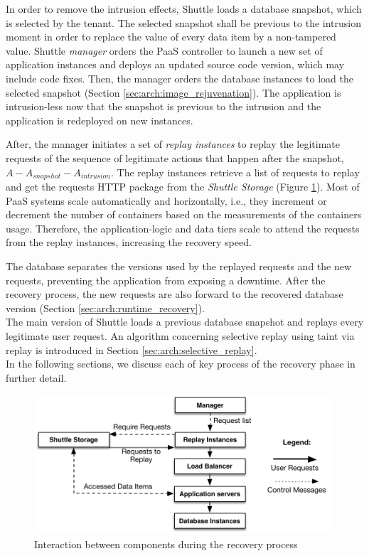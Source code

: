 In order to remove the intrusion effects, Shuttle loads a database snapshot, which is selected by the tenant. The selected snapshot shall be previous to the intrusion moment in order to replace the value of every data item by a non-tampered value. Shuttle \textit{manager} orders the \ac{PaaS} controller to launch a new set of application instances and deploys an updated source code version, which may include code fixes. Then, the manager orders the database instances to load the selected snapshot (Section \ref{sec:arch:image_rejuvenation}). The application is intrusion-less now that the snapshot is previous to the intrusion and the application is redeployed on new instances. 

After, the manager initiates a set of \textit{replay instances} to replay the legitimate requests of the sequence of legitimate actions that happen after the snapshot, $A-A_{snapshot}-A_{intrusion}$. The replay instances retrieve a list of requests to replay and get the requests \ac{HTTP} package from the \emph{Shuttle Storage} (Figure \ref{fig:replay_execution}). Most of \ac{PaaS} systems scale automatically and horizontally, i.e., they increment or decrement the number of containers based on the measurements of the containers usage. Therefore, the application-logic and data tiers scale to attend the requests from the replay instances, increasing the recovery speed.

The database separates the versions used by the replayed requests and the new requests, preventing the application from exposing a downtime. After the recovery process, the new requests are also forward to the recovered database version (Section \ref{sec:arch:runtime_recovery}).\\


The main version of Shuttle loads a previous database snapshot and replays every legitimate user request. An algorithm concerning selective replay using taint via replay is introduced in Section \ref{sec:arch:selective_replay}. \\

In the following sections, we discuss each of key process of the recovery phase in further detail.

\begin{figure}
\centering
\includegraphics[width=110mm]{images/replayExecution}
\caption{Interaction between components during the recovery process}
\label{fig:replay_execution}
\end{figure}









